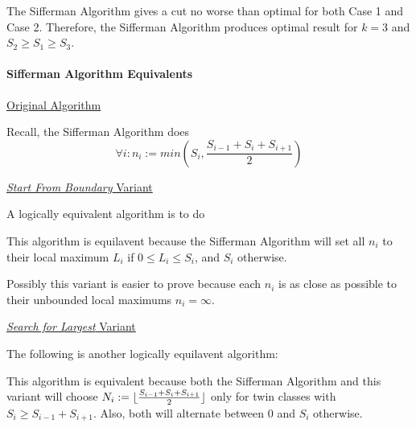 \documentclass[12pt]{article}
\DeclarePairedDelimiter{\floor}{\lfloor}{\rfloor}
\begin{document}
The Sifferman Algorithm gives a cut no worse than optimal for both Case 1 and Case 2. Therefore, the Sifferman Algorithm produces optimal result for $k=3$ and $S_2 \geq S_1 \geq S_3$.




\paragraph{Sifferman Algorithm Equivalents} \leavevmode

\underline{Original Algorithm}

Recall, the Sifferman Algorithm does
$$\forall i : n_i := min \left( S_i, \frac{S_{i-1}+S_i+S_{i+1}}{2} \right)$$

\pagebreak


\underline{\emph{Start From Boundary} Variant}

A logically equivalent algorithm is to do


This algorithm is equilavent because the Sifferman Algorithm will set all $n_i$ to their local maximum $L_i$ if $0 \leq L_i \leq S_i$, and $S_i$ otherwise.

Possibly this variant is easier to prove because each $n_i$ is as close as possible to their unbounded local maximums $n_i = \infty$.


\underline{\emph{Search for Largest} Variant}

The following is another logically equilavent algorithm:


This algorithm is equivalent because both the Sifferman Algorithm and this variant will choose $N_i := \floor{\frac{S_{i-1}+S_i+S_{i+1}}{2}}$ only for twin classes with $S_i \geq S_{i-1}+S_{i+1}$. Also, both will alternate between $0$ and $S_i$ otherwise.
\end{document}

